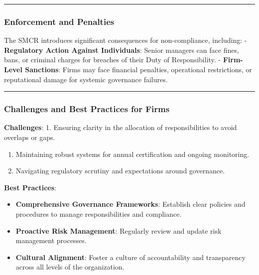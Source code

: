 \documentclass[
  a4paper,
]{article}
\providecommand{\tightlist}{%
  \setlength{\itemsep}{0pt}\setlength{\parskip}{0pt}}\usepackage{longtable,booktabs,array}
\begin{document}
\begin{center}\rule{0.5\linewidth}{0.5pt}\end{center}

\subsubsection{Enforcement and
Penalties}\label{enforcement-and-penalties}

The SMCR introduces significant consequences for non-compliance,
including: - \textbf{Regulatory Action Against Individuals}: Senior
managers can face fines, bans, or criminal charges for breaches of their
Duty of Responsibility. - \textbf{Firm-Level Sanctions}: Firms may face
financial penalties, operational restrictions, or reputational damage
for systemic governance failures.

\begin{center}\rule{0.5\linewidth}{0.5pt}\end{center}

\subsubsection{Challenges and Best Practices for
Firms}\label{challenges-and-best-practices-for-firms}

\textbf{Challenges}: 1. Ensuring clarity in the allocation of
responsibilities to avoid overlaps or gaps.

\begin{enumerate}
\def\labelenumi{\arabic{enumi}.}
\setcounter{enumi}{1}
\item
  Maintaining robust systems for annual certification and ongoing
  monitoring.
\item
  Navigating regulatory scrutiny and expectations around governance.
\end{enumerate}

\textbf{Best Practices}:

\begin{itemize}
\tightlist
\item
  \textbf{Comprehensive Governance Frameworks}: Establish clear policies
  and procedures to manage responsibilities and compliance.
\item
  \textbf{Proactive Risk Management}: Regularly review and update risk
  management processes.
\item
  \textbf{Cultural Alignment}: Foster a culture of accountability and
  transparency across all levels of the organization.
\end{itemize}
\end{document}
